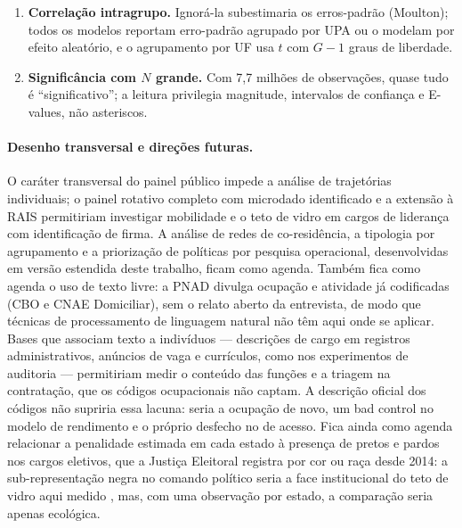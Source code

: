 \documentclass[11pt, a4paper, oneside]{article}
\begin{document}
\begin{enumerate}
    regressão na amostra. A robustez ponderada pelo peso da PNAD muda o gap em cerca de
    meio ponto percentual.
  \item \textbf{Correlação intragrupo.} Ignorá-la subestimaria os erros-padrão (Moulton);
    todos os modelos reportam erro-padrão agrupado por UPA ou o modelam por efeito
    aleatório, e o agrupamento por UF usa $t$ com $G-1$ graus de liberdade.
  \item \textbf{Significância com $N$ grande.} Com 7{,}7 milhões de observações, quase tudo é
    ``significativo''; a leitura privilegia magnitude, intervalos de confiança e E-values,
    não asteriscos.
\end{enumerate}

\paragraph{Desenho transversal e direções futuras.}
O caráter transversal do painel público impede a análise de trajetórias
individuais; o painel rotativo completo com microdado identificado e a extensão
à RAIS permitiriam investigar mobilidade e o teto de vidro em cargos de liderança
com identificação de firma. A análise de redes de co-residência, a tipologia
por agrupamento e a priorização de políticas por pesquisa operacional,
desenvolvidas em versão estendida deste trabalho, ficam como agenda. Também fica
como agenda o uso de texto livre: a PNAD divulga ocupação e atividade já codificadas
(CBO e CNAE Domiciliar), sem o relato aberto da entrevista, de modo que técnicas de
processamento de linguagem natural não têm aqui onde se aplicar. Bases que associam
texto a indivíduos --- descrições de cargo em registros administrativos, anúncios de
vaga e currículos, como nos experimentos de auditoria \cite{pager2007} --- permitiriam
medir o conteúdo das funções e a triagem na contratação, que os códigos ocupacionais
não captam. A descrição oficial dos códigos não supriria essa lacuna: seria a
ocupação de novo, um {bad control} no modelo de rendimento e o próprio desfecho
no de acesso. Fica ainda como agenda relacionar a penalidade estimada em cada estado
à presença de pretos e pardos nos cargos eletivos, que a Justiça Eleitoral registra
por cor ou raça desde 2014: a sub-representação negra no comando político seria a
face institucional do teto de vidro aqui medido \cite{almeida2019}, mas, com uma
observação por estado, a comparação seria apenas ecológica.

\bigskip
\end{document}
